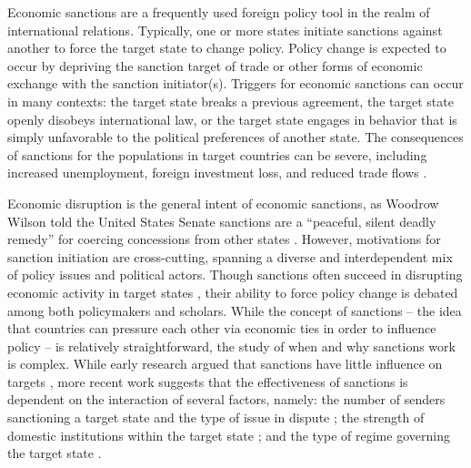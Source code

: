 \label{intro}

Economic sanctions are a frequently used foreign policy tool in the realm of international relations. Typically, one or more states initiate sanctions against another to force the target state to change policy. Policy change is expected to occur by depriving the sanction target of trade or other forms of economic exchange with the sanction initiator(s). Triggers for economic sanctions can occur in many contexts: the target state breaks a previous agreement, the target state openly disobeys international law, or the target state engages in behavior that is simply unfavorable to the political preferences of another state. The consequences of sanctions for the populations in target countries can be severe, including increased unemployment, foreign investment loss, and reduced trade flows \citep{hufbauer1997us, hufbauer2003impact}. 

Economic disruption is the general intent of economic sanctions, as Woodrow Wilson told the United States Senate sanctions are a ``peaceful, silent deadly remedy'' for coercing concessions from other states \citep{foley23}. However, motivations for sanction initiation are cross-cutting, spanning a diverse and interdependent mix of policy issues and political actors. Though sanctions often succeed in disrupting economic activity in target states \citep{escriba2010dealing}, their ability to force policy change is debated among both policymakers and scholars.  While the concept of sanctions -- the idea that countries can pressure each other via economic ties in order to influence policy -- is relatively straightforward, the study of when and why sanctions work is complex. While early research argued that sanctions have little influence on targets \citep{dashti1997, drezner1998, lam1990, morgan1997}, more recent work suggests that the effectiveness of sanctions is dependent on the interaction of several factors, namely: the number of senders sanctioning a target state and the type of issue in dispute \citep{miers2002, morgan2009threat}; the strength of domestic institutions within the target state \citep{dashti1997,marinov2005}; and the type of regime governing the target state \citep{allen2008domestic, lektzian2007,mcgillivray2004}.

